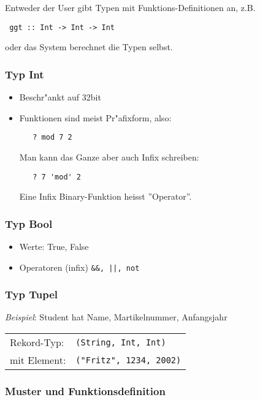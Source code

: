 \documentclass[german,10pt, a4paper, twocolumn]{scrartcl}
\theoremstyle{definition}
\theoremstyle{remark}
\begin{document}
Entweder der User gibt Typen mit Funktions-Definitionen an, z.B.
\begin{verbatim}
 ggt :: Int -> Int -> Int
\end{verbatim}
oder das System berechnet die Typen selbst.

\subsubsection{Typ Int}

\begin{itemize}
 \item Beschr"ankt auf 32bit
 \item Funktionen sind meist Pr"afixform, also:
  \begin{verbatim}
   ? mod 7 2
  \end{verbatim}
  Man kann das Ganze aber auch Infix schreiben:
  \begin{verbatim}
   ? 7 'mod' 2
  \end{verbatim}
  Eine Infix Binary-Funktion heisst ''Operator''.
\end{itemize}

\subsubsection{Typ Bool}

\begin{itemize}
 \item Werte: True, False
 \item Operatoren (infix) \verb#&&, ||, not#
\end{itemize}

\subsubsection{Typ Tupel}

\textit{Beispiel}: Student hat Name, Martikelnummer, Anfangsjahr\\

\begin{tabular}{ll}
 Rekord-Typ:&	\verb#(String, Int, Int)#\\
 mit Element:&	\verb#("Fritz", 1234, 2002)#
\end{tabular}

\subsubsection{Muster und Funktionsdefinition}
\end{document}
